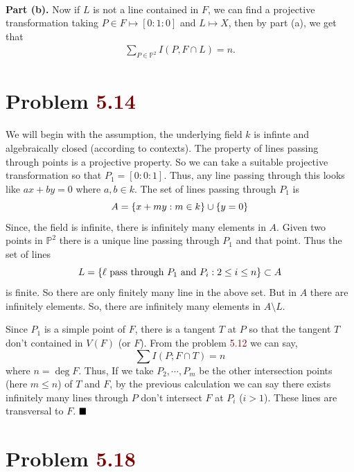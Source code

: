 \documentclass[12pt]{article}
\begin{document}
\

\noindent\textbf{Part (b).} Now if $L$ is not a line contained in $F$, we can find a projective transformation taking $P \in F \mapsto [0:1:0]$ and $L \mapsto X$, then by part (a), we get that
\begin{align*}
   \sum_{P \in \mathbb{P}^2} I(P, F \cap L) = n.
\end{align*}

\section*{Problem \textcolor{maroon}{5.14}}
We will begin with the assumption, the underlying field $k$ is infinte and algebraically closed (according to contexts). The property of lines passing through points is a projective property. So we can take a suitable projective transformation so that $P_1 = [0:0:1]$. Thus, any line passing through this looks like $ax +by = 0$ where $a,b \in k$. The set of lines passing through $P_1$ is $$A = \qty{x+my : m \in k} \cup \qty{y=0}$$ Since, the field is infinite, there is infinitely many elements in $A$. Given two points in $\mathbb{P}^2$ there is a unique line passing through $P_1$ and that point. Thus the set of lines $$L=\qty{\ell \text{ pass through } P_1 \text{ and }P_{i} : 2 \leq i \leq n} \subset A$$ is finite. So there are only finitely many line in the above set. But in $A$ there are infinitely elements. So, there are infinitely many elements in $A \setminus L$.

\vspace*{0.2cm}

\noindent Since $P_1$ is a simple point of $F$, there is a tangent $T$ at $P$ so that the tangent $T$ don't contained in $V(F)$ (or $F$). From the problem \textcolor{maroon}{5.12} we can say, $$\sum I(P;F\cap T)=n$$ where $n = \deg F$. Thus, If we take $P_2,\cdots,P_m$ be the other intersection points (here $m \leq n$) of $T$ and $F$, by the previous calculation we can say there exists infinitely many lines through $P$ don't intersect $F$ at $P_i$ ($i >1$). These lines are transversal to $F$. $\hfill \blacksquare$

\section*{Problem \textcolor{maroon}{5.18}}
\end{document}
